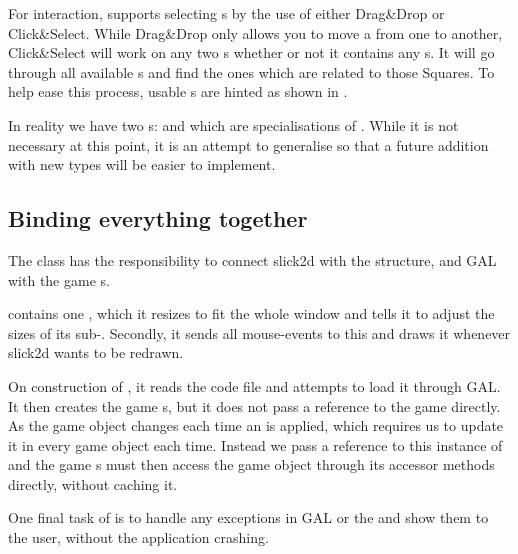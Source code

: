 For interaction,  supports selecting s by
the use of either Drag\&Drop or Click\&Select. While Drag\&Drop only allows
you to move a  from one  to another, Click\&Select 
will work on any two s whether or not it contains any
s. It will go through all available s and find
the ones which are related to those Squares. To help ease this process, usable
s are hinted as shown in .


In reality we have two s:  and
 which are specialisations of .
While it is not necessary at this point, it is an attempt to generalise
 so that a future addition with new  types
will be easier to implement.

\subsection{Binding everything together}
\label{sec:connection}

The class  has the responsibility to connect slick2d
with the  structure, and GAL with the game s.

 contains one , which it resizes
to fit the whole window and tells it to adjust the sizes of its
sub-. Secondly, it sends all mouse-events to this
 and draws it whenever slick2d wants to be redrawn.

On construction of , it reads the \productname{} code file
and attempts to load it through GAL. It then creates the game
s, but it does not pass a reference to the game directly. As
the game object changes each time an  is applied, which
requires us to update it in every game object each time. Instead we pass a
reference to this instance of  and the game
s must
then access the game object through its accessor methods directly, without
caching it.

One final task of  is to handle any exceptions in GAL or
the  and show them to the user, without the application
crashing.
